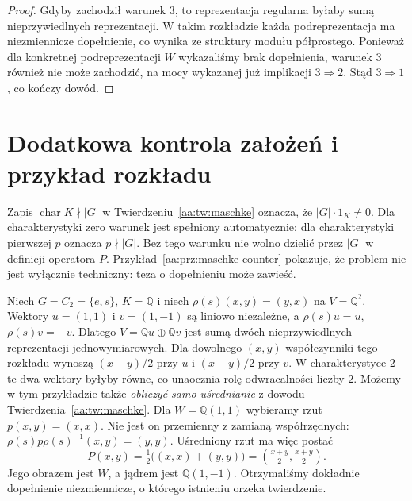 \begin{proof}
Gdyby zachodził warunek 3, to reprezentacja regularna
byłaby sumą nieprzywiedlnych reprezentacji. W takim
rozkładzie każda podreprezentacja ma niezmiennicze
dopełnienie, co wynika ze struktury modułu półprostego.
Ponieważ dla konkretnej podreprezentacji $W$ wykazaliśmy
brak dopełnienia, warunek 3 również nie może zachodzić,
na mocy wykazanej już implikacji $3\Rightarrow2$.
Stąd $3\Rightarrow1$, co kończy dowód.
\end{proof}

\section{Dodatkowa kontrola założeń i przykład rozkładu}
\begin{uwaga}\label{aa:rem:maschke-char}
Zapis $\operatorname{char}K\nmid |G|$ w Twierdzeniu~\ref{aa:tw:maschke}
oznacza, że $|G|\cdot1_K\ne0$. Dla charakterystyki zero
warunek jest spełniony automatycznie; dla charakterystyki
pierwszej $p$ oznacza $p\nmid|G|$. Bez tego warunku
nie wolno dzielić przez $|G|$ w definicji operatora $P$.
Przykład~\ref{aa:prz:maschke-counter} pokazuje, że problem
nie jest wyłącznie techniczny: teza o dopełnieniu może zawieść.
\end{uwaga}
\begin{przyklad}
\label{aa:prz:maschke-explicit}
Niech $G=C_2=\{e,s\}$, $K=\mathbb Q$ i niech
$\rho(s)(x,y)=(y,x)$ na $V=\mathbb Q^2$.
Wektory $u=(1,1)$ i $v=(1,-1)$ są liniowo niezależne,
a $\rho(s)u=u$, $\rho(s)v=-v$. Dlatego
$V=\mathbb Qu\oplus\mathbb Qv$ jest sumą dwóch
nieprzywiedlnych reprezentacji jednowymiarowych.
Dla dowolnego $(x,y)$ współczynniki tego rozkładu wynoszą
$(x+y)/2$ przy $u$ i $(x-y)/2$ przy $v$.
W charakterystyce $2$ te dwa wektory byłyby równe,
co unaocznia rolę odwracalności liczby $2$.
Możemy w tym przykładzie także \emph{obliczyć samo
uśrednianie} z dowodu Twierdzenia~\ref{aa:tw:maschke}.
Dla $W=\mathbb Q(1,1)$ wybieramy rzut
$p(x,y)=(x,x)$. Nie jest on przemienny z zamianą
współrzędnych: $\rho(s)p\rho(s)^{-1}(x,y)=(y,y)$.
Uśredniony rzut ma więc postać
\[
P(x,y)=\tfrac12\big((x,x)+(y,y)\big)
=\left(\tfrac{x+y}{2},\tfrac{x+y}{2}\right).
\]
Jego obrazem jest $W$, a jądrem jest
$\mathbb Q(1,-1)$. Otrzymaliśmy dokładnie dopełnienie
niezmiennicze, o którego istnieniu orzeka twierdzenie.
\end{przyklad}

